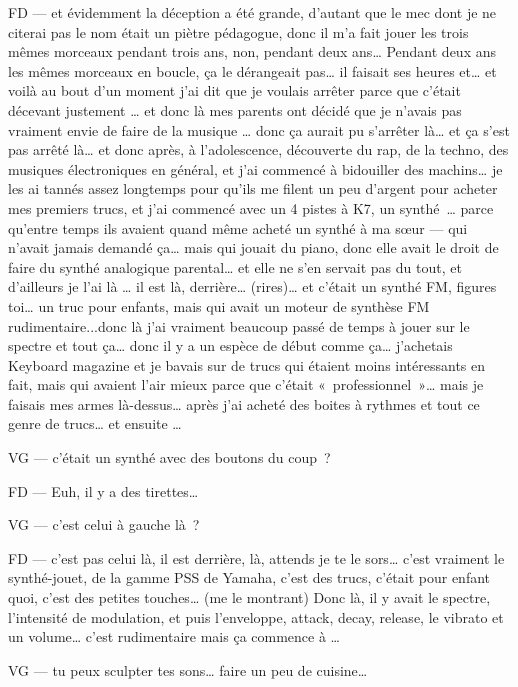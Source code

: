 FD —  et évidemment la déception a été grande, d'autant que le mec dont je ne citerai pas le nom était un piètre pédagogue, donc il m'a fait jouer les trois mêmes morceaux pendant trois ans, non, pendant deux ans… Pendant deux ans les mêmes morceaux en boucle, ça le dérangeait pas… il faisait ses heures et… et voilà au bout d'un moment j'ai dit que je voulais arrêter parce que c'était décevant justement … et donc là mes parents ont décidé que je n'avais pas vraiment envie de faire de la musique … donc ça aurait pu s'arrêter là… et ça s'est pas arrêté là… et donc après, à l'adolescence, découverte du rap, de la techno, des musiques électroniques en général, et j'ai commencé à bidouiller des machins… je les ai tannés assez longtemps pour qu'ils me filent un peu d'argent pour acheter mes premiers trucs, et j'ai commencé avec un 4 pistes à K7, un synthé … parce qu'entre temps ils avaient quand même acheté un synthé à ma sœur — qui n'avait jamais demandé ça… mais qui jouait du piano, donc elle avait le droit de faire du synthé analogique parental… et elle ne s'en servait pas du tout, et d'ailleurs je l'ai là … il est là, derrière… (rires)… et c'était un synthé FM, figures toi… un truc pour enfants, mais qui avait un moteur de synthèse FM rudimentaire...donc là j'ai vraiment beaucoup passé de temps à jouer sur le spectre et tout ça… donc il y a un espèce de début comme ça… j'achetais Keyboard magazine et je bavais sur de trucs qui étaient moins intéressants en fait, mais qui avaient l'air mieux parce que c'était « professionnel »…  mais je faisais mes armes là-dessus… après j'ai acheté des boites à rythmes et tout ce genre de trucs… et ensuite … 

VG —  c'était un synthé avec des boutons du coup ? 

FD —  Euh, il y a des tirettes… 

VG —  c'est celui à gauche là ? 

FD —  c'est pas celui là, il est derrière, là, attends je te le sors… c'est vraiment le synthé-jouet, de la gamme PSS de Yamaha, c'est des trucs, c'était pour enfant quoi, c'est des petites touches… (me le montrant) Donc là, il y avait le spectre, l'intensité de modulation, et puis l'enveloppe, attack, decay, release, le vibrato et un volume… c'est rudimentaire mais ça commence à … 

VG —  tu peux sculpter tes sons… faire un peu de cuisine… 

